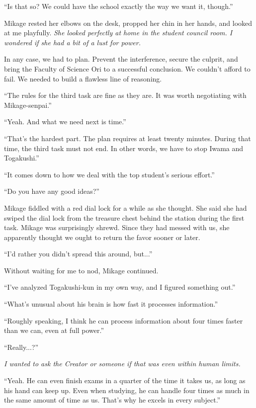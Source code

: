 \documentclass[
    a4paper,
    12pt,
    twoside,
    openany,
    UTF8,
    fontset=windows
]{ctexbook}
\begin{document}
``Is that so? We could have the school exactly the way we want it, though.''

Mikage rested her elbows on the desk, propped her chin in her hands, and looked at me playfully. \textit{She looked perfectly at home in the student council room. I wondered if she had a bit of a lust for power.}

In any case, we had to plan. Prevent the interference, secure the culprit, and bring the Faculty of Science Ori to a successful conclusion. We couldn't afford to fail. We needed to build a flawless line of reasoning.

``The rules for the third task are fine as they are. It was worth negotiating with Mikage-senpai.''

``Yeah. And what we need next is time.''

``That's the hardest part. The plan requires at least twenty minutes. During that time, the third task must not end. In other words, we have to stop Iwama and Togakushi.''

``It comes down to how we deal with the top student's serious effort.''

``Do you have any good ideas?''

Mikage fiddled with a red dial lock for a while as she thought. She said she had swiped the dial lock from the treasure chest behind the station during the first task. Mikage was surprisingly shrewd. Since they had messed with us, she apparently thought we ought to return the favor sooner or later.

``I'd rather you didn't spread this around, but...''

Without waiting for me to nod, Mikage continued.

``I've analyzed Togakushi-kun in my own way, and I figured something out.''

``What's unusual about his brain is how fast it processes information.''

``Roughly speaking, I think he can process information about four times faster than we can, even at full power.''

``Really...?''

\textit{I wanted to ask the Creator or someone if that was even within human limits.}

``Yeah. He can even finish exams in a quarter of the time it takes us, as long as his hand can keep up. Even when studying, he can handle four times as much in the same amount of time as us. That's why he excels in every subject.''
\end{document}
